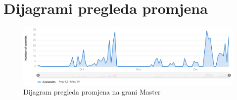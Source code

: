 					
		\eject
		
		\section*{Dijagrami pregleda promjena}
		
		\begin{figure}[H]
			\begin{center}
				\includegraphics[width=15cm]{slike/dijagrampregledapromjena.PNG}
			\end{center}
			\caption{Dijagram pregleda promjena na grani Master}
			\label{fig:master}
		\end{figure}
		
